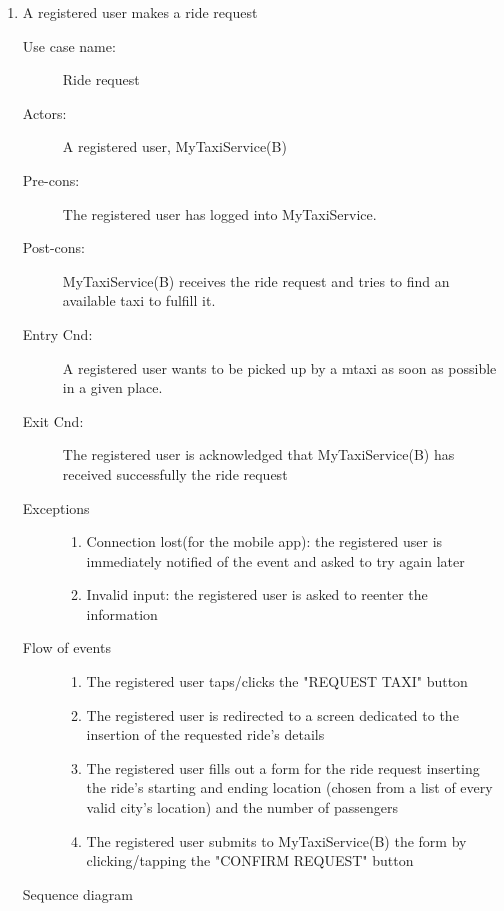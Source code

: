 \documentclass[11pt,titlepage]{article} %
\begin{document}
	\begin{enumerate}	
	      \item A registered user makes a ride request
		\begin{description}
		        \item [Use case name:] Ride request 
		        \item [Actors:] A registered user, MyTaxiService(B)
		        \item [Pre-cons:] The registered user has logged into MyTaxiService.
		        \item [Post-cons:] MyTaxiService(B) receives the ride request and tries to find an available taxi to fulfill it.
		        \item [Entry Cnd:] A registered user wants to be picked up by a mtaxi as soon as possible in a given place.
		        \item [Exit Cnd:] The registered user is acknowledged that MyTaxiService(B) has received successfully the ride
		        request
		        \item [Exceptions]\hfill
			\begin{enumerate}
			          \item Connection lost(for the mobile app): the registered user is immediately notified of the event and
			          asked to try again later
			          \item Invalid input: the registered user is asked to reenter the information
			\end{enumerate}
		        \item [Flow of events]\hfill
			\begin{enumerate}
			          \item The registered user taps/clicks the "REQUEST TAXI" button
			          \item The registered user is redirected to a screen dedicated to the insertion
			          of the requested ride's details
			          \item The registered user fills out a form for the ride request inserting the ride's starting and ending location
			          (chosen from a list of every valid city's location) and the number of passengers
			          \item The registered user submits to MyTaxiService(B) the form by clicking/tapping the "CONFIRM REQUEST" button
			\end{enumerate}
		\end{description}
		\newpage
		Sequence diagram
		\begin{center}

\end{center}
\end{enumerate}
\end{document}
